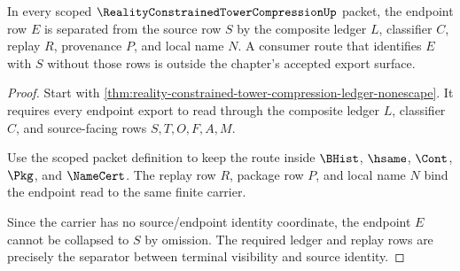 \begin{theorem}
\label{thm:reality-constrained-tower-compression-endpoint-source-separation}
In every scoped $\RealityConstrainedTowerCompressionUp$ packet, the endpoint row $E$ is separated from the source row $S$ by the composite ledger $L$, classifier $C$, replay $R$, provenance $P$, and local name $N$. A consumer route that identifies $E$ with $S$ without those rows is outside the chapter's accepted export surface.
\end{theorem}
\begin{proof}
Start with \autoref{thm:reality-constrained-tower-compression-ledger-nonescape}. It requires every endpoint export to read through the composite ledger $L$, classifier $C$, and source-facing rows $S,T,O,F,A,M$.

Use the scoped packet definition to keep the route inside $\BHist$, $\hsame$, $\Cont$, $\Pkg$, and $\NameCert$. The replay row $R$, package row $P$, and local name $N$ bind the endpoint read to the same finite carrier.

Since the carrier has no source/endpoint identity coordinate, the endpoint $E$ cannot be collapsed to $S$ by omission. The required ledger and replay rows are precisely the separator between terminal visibility and source identity.
\end{proof}

